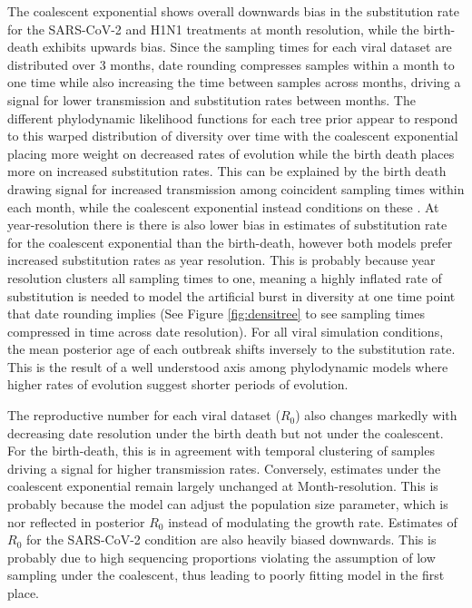 \documentclass[11pt]{article}
\begin{document}
\begin{spacing}{1.5}
The coalescent exponential shows overall downwards bias in the substitution rate for the SARS-CoV-2 and H1N1 treatments at month resolution, while the birth-death exhibits upwards bias. Since the sampling times for each viral dataset are distributed over 3 months, date rounding compresses samples within a month to one time while also increasing the time between samples across months, driving a signal for lower transmission and substitution rates between months. The different phylodynamic likelihood functions for each tree prior appear to respond to this warped distribution of diversity over time with the coalescent exponential placing more weight on decreased rates of evolution while the birth death places more on increased substitution rates. This can be explained by the birth death drawing signal for increased transmission among coincident sampling times within each month, while the coalescent exponential instead conditions on these \citep{volz_sampling_2014}. At year-resolution there is there is also lower bias in estimates of substitution rate for the coalescent exponential than the birth-death, however both models prefer increased substitution rates as year resolution. This is probably because year resolution clusters all sampling times to one, meaning a highly inflated rate of substitution is needed to model the artificial burst in diversity at one time point that date rounding implies (See Figure \ref{fig:densitree} to see sampling times compressed in time across date resolution). For all viral simulation conditions, the mean posterior age of each outbreak shifts inversely to the substitution rate. This is the result of a well understood axis among phylodynamic models where higher rates of evolution suggest shorter periods of evolution.

The reproductive number for each viral dataset ($R_0$) also changes markedly with decreasing date resolution under the birth death but not under the coalescent. For the birth-death, this is in agreement with temporal clustering of samples driving a signal for higher transmission rates. Conversely, estimates under the coalescent exponential remain largely unchanged at Month-resolution. This is probably because the model can adjust the population size parameter, which is nor reflected in posterior $R_0$ instead of modulating the growth rate. Estimates of $R_0$ for the SARS-CoV-2 condition are also heavily biased downwards. This is probably due to high sequencing proportions violating the assumption of low sampling under the coalescent, thus leading to poorly fitting model in the first place.


\end{spacing}
\end{document}
